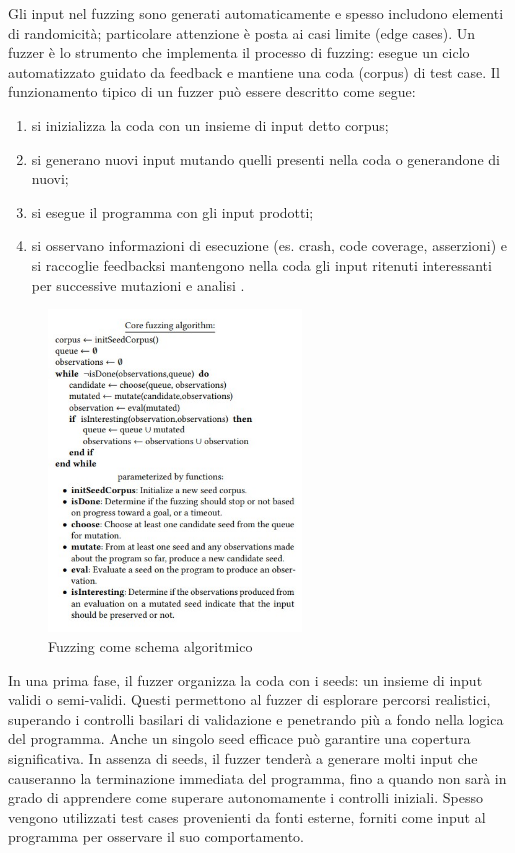 Gli input nel fuzzing sono generati automaticamente e spesso includono elementi di randomicità; particolare attenzione è posta ai casi limite (edge cases). Un fuzzer è lo strumento che implementa il processo di fuzzing: esegue un ciclo automatizzato guidato da feedback e mantiene una coda (corpus) di test case. Il funzionamento tipico di un fuzzer può essere descritto come segue:
\begin{enumerate}
    \item si inizializza la coda con un insieme di input detto corpus;
    \item si generano nuovi input mutando quelli presenti nella coda o generandone di nuovi;
    \item si esegue il programma con gli input prodotti;
    \item si osservano informazioni di esecuzione (es. crash, code coverage, asserzioni) e si raccoglie feedbacksi mantengono nella coda gli input ritenuti interessanti per successive mutazioni e analisi \cite{ref1}.
\end{enumerate}

\begin{figure}[htbp]        
  \centering               
  \includegraphics[width=0.6\textwidth]{immagini/fuzzing.jpg}  
  \caption{Fuzzing come schema algoritmico \cite{ref21}}  
  \label{fig:fuzzing}      
\end{figure}

In una prima fase, il fuzzer organizza la coda con i seeds: un insieme di input validi o semi-validi. Questi permettono al fuzzer di esplorare percorsi realistici, superando i controlli basilari di validazione e penetrando più a fondo nella logica del programma. Anche un singolo seed efficace può garantire una copertura significativa. In assenza di seeds, il fuzzer tenderà a generare molti input che causeranno la terminazione immediata del programma, fino a quando non sarà in grado di apprendere come superare autonomamente i controlli iniziali. Spesso vengono utilizzati test cases provenienti da fonti esterne, forniti come input al programma per osservare il suo comportamento.

